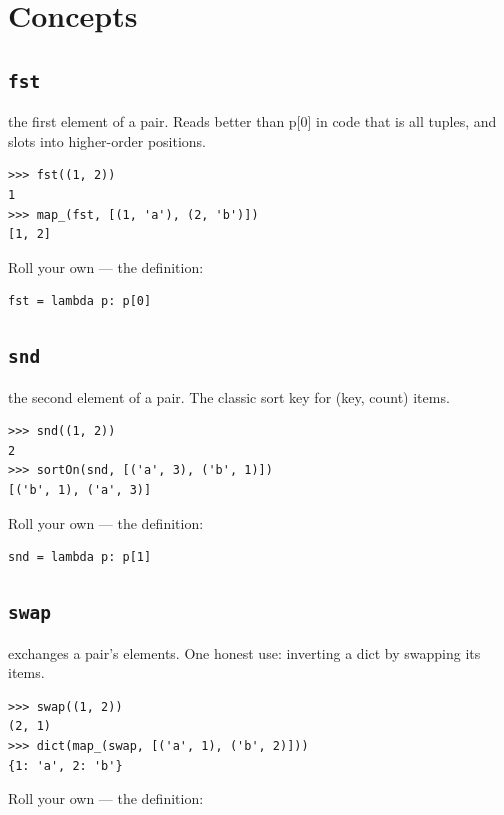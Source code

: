 \documentclass[10pt,letterpaper]{book}
\begin{document}
\section{Concepts}
\subsection{\texttt{fst}}\label{def:fst}
the first element of a pair. Reads better than p[0] in code that is all tuples, and slots into higher-order positions.
\begin{lstlisting}[style=ex]
>>> fst((1, 2))
1
>>> map_(fst, [(1, 'a'), (2, 'b')])
[1, 2]
\end{lstlisting}

Roll your own --- the definition:

\begin{lstlisting}[style=ex]
fst = lambda p: p[0]
\end{lstlisting}

\subsection{\texttt{snd}}\label{def:snd}
the second element of a pair. The classic sort key for (key, count) items.
\begin{lstlisting}[style=ex]
>>> snd((1, 2))
2
>>> sortOn(snd, [('a', 3), ('b', 1)])
[('b', 1), ('a', 3)]
\end{lstlisting}

Roll your own --- the definition:

\begin{lstlisting}[style=ex]
snd = lambda p: p[1]
\end{lstlisting}

\subsection{\texttt{swap}}\label{def:swap}
exchanges a pair's elements. One honest use: inverting a dict by swapping its items.
\begin{lstlisting}[style=ex]
>>> swap((1, 2))
(2, 1)
>>> dict(map_(swap, [('a', 1), ('b', 2)]))
{1: 'a', 2: 'b'}
\end{lstlisting}

Roll your own --- the definition:
\end{document}

